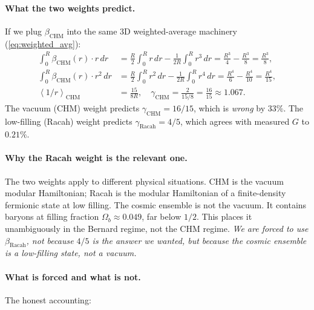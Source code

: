 \documentclass[11pt,letterpaper]{article}
\newcommand{\av}[1]{\left\langle #1 \right\rangle}
\begin{document}
\paragraph{What the two weights predict.}
If we plug $\beta_{\mathrm{CHM}}$ into the same 3D weighted-average
machinery (\cref{eq:weighted_avg}):
\begin{align}
  \int_0^R \beta_{\mathrm{CHM}}(r) \cdot r \,dr
   &= \tfrac{R}{2}\!\!\int_0^R r\,dr - \tfrac{1}{2R}\!\!\int_0^R r^3\,dr
    = \tfrac{R^3}{4} - \tfrac{R^3}{8} = \tfrac{R^3}{8}, \\
  \int_0^R \beta_{\mathrm{CHM}}(r) \cdot r^2 \,dr
   &= \tfrac{R}{2}\!\!\int_0^R r^2\,dr - \tfrac{1}{2R}\!\!\int_0^R r^4\,dr
    = \tfrac{R^4}{6} - \tfrac{R^4}{10} = \tfrac{R^4}{15}, \\
  \av{1/r}_{\mathrm{CHM}} &= \tfrac{15}{8R}, \quad
  \gamma_{\mathrm{CHM}} = \tfrac{2}{15/8} = \tfrac{16}{15} \approx 1.067.
\end{align}
The vacuum (CHM) weight predicts $\gamma_{\mathrm{CHM}} = 16/15$,
which is \emph{wrong} by $33\%$. The low-filling (Racah) weight
predicts $\gamma_{\mathrm{Racah}} = 4/5$, which agrees with measured
$G$ to $0.21\%$.

\paragraph{Why the Racah weight is the relevant one.}
The two weights apply to different physical situations. CHM is the
vacuum modular Hamiltonian; Racah is the modular Hamiltonian of a
finite-density fermionic state at low filling. The cosmic ensemble
is not the vacuum. It contains baryons at filling fraction
$\Omega_b \approx 0.049$, far below $1/2$. This places it
unambiguously in the Bernard regime, not the CHM regime. \emph{We
are forced to use $\beta_{\mathrm{Racah}}$, not because $4/5$ is
the answer we wanted, but because the cosmic ensemble is a
low-filling state, not a vacuum.}

\paragraph{What is forced and what is not.}
The honest accounting:
\end{document}
